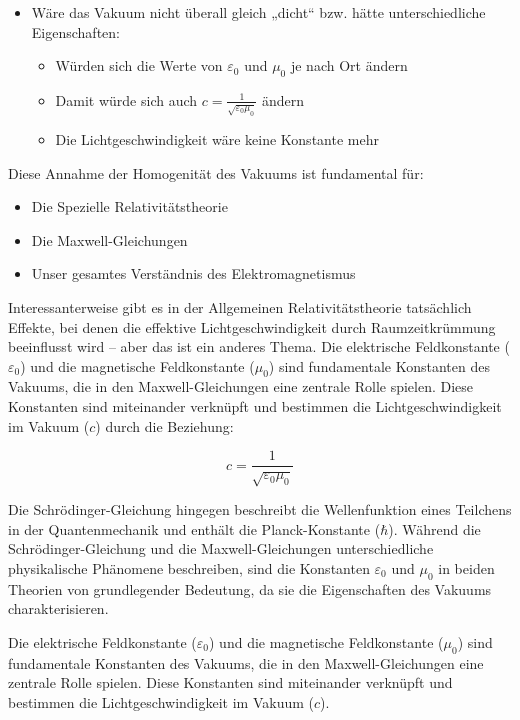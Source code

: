 \documentclass[12pt,a4paper]{article}
\begin{document}
	\begin{itemize}
		\item Wäre das Vakuum nicht überall gleich „dicht“ bzw. hätte unterschiedliche Eigenschaften:
		\begin{itemize}
			\item Würden sich die Werte von \(\varepsilon_0\) und \(\mu_0\) je nach Ort ändern
			\item Damit würde sich auch \(c = \frac{1}{\sqrt{\varepsilon_0 \mu_0}}\) ändern
			\item Die Lichtgeschwindigkeit wäre keine Konstante mehr
		\end{itemize}
	\end{itemize}
	
	Diese Annahme der Homogenität des Vakuums ist fundamental für:
	\begin{itemize}
		\item Die Spezielle Relativitätstheorie
		\item Die Maxwell-Gleichungen
		\item Unser gesamtes Verständnis des Elektromagnetismus
	\end{itemize}
	
	Interessanterweise gibt es in der Allgemeinen Relativitätstheorie tatsächlich Effekte, bei denen die effektive Lichtgeschwindigkeit durch Raumzeitkrümmung beeinflusst wird – aber das ist ein anderes Thema.
	Die elektrische Feldkonstante ($\varepsilon_0$) und die magnetische Feldkonstante ($\mu_0$) sind fundamentale Konstanten des Vakuums, die in den Maxwell-Gleichungen eine zentrale Rolle spielen. Diese Konstanten sind miteinander verknüpft und bestimmen die Lichtgeschwindigkeit im Vakuum ($c$) durch die Beziehung:
	
	\[
	c = \frac{1}{\sqrt{\varepsilon_0 \mu_0}}
	\]
	
	Die Schrödinger-Gleichung hingegen beschreibt die Wellenfunktion eines Teilchens in der Quantenmechanik und enthält die Planck-Konstante ($\hbar$). Während die Schrödinger-Gleichung und die Maxwell-Gleichungen unterschiedliche physikalische Phänomene beschreiben, sind die Konstanten $\varepsilon_0$ und $\mu_0$ in beiden Theorien von grundlegender Bedeutung, da sie die Eigenschaften des Vakuums charakterisieren.
	
	
	
	Die elektrische Feldkonstante ($\varepsilon_0$) und die magnetische Feldkonstante ($\mu_0$) sind fundamentale Konstanten des Vakuums, die in den Maxwell-Gleichungen eine zentrale Rolle spielen. Diese Konstanten sind miteinander verknüpft und bestimmen die Lichtgeschwindigkeit im Vakuum ($c$). 
	
\end{document}
